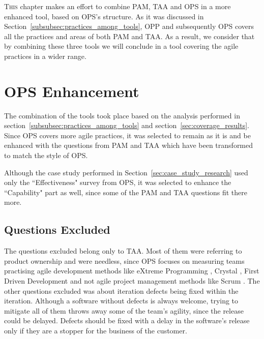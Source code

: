 \lettrine[lines=2, loversize=-0.1, lraise=0.1]{T}{his} chapter makes an effort to combine \ac{PAM}, \ac{TAA} and \ac{OPS} in a more enhanced tool, based on \ac{OPS}'s structure. As it was discussed in Section~\ref{subsubsec:practices_among_tools}, \ac{OPP} and subsequently \ac{OPS} covers all the practices and areas of both \ac{PAM} and \ac{TAA}. As a result, we consider that by combining these three tools we will conclude in a tool covering the agile practices in a wider range. 

\section{\ac{OPS} Enhancement}
The combination of the tools took place based on the analysis performed in section~\ref{subsubsec:practices_among_tools} and section~\ref{sec:coverage_results}. Since \ac{OPS} covers more agile practices, it was selected to remain as it is and be enhanced with the questions from \ac{PAM} and \ac{TAA} which have been transformed to match the style of \ac{OPS}.

Although the case study performed in Section~\ref{sec:case_study_research} used only the ``Effectiveness" survey from \ac{OPS}, it was selected to enhance the ``Capability" part as well, since some of the \ac{PAM} and \ac{TAA} questions fit there more.

\subsection{Questions Excluded}
The questions excluded belong only to \ac{TAA}. Most of them were referring to product ownership and were needless, since \ac{OPS} focuses on measuring teams practising agile development methods like eXtreme Programming \cite{Beck:2004:EPE:1076267}, Crystal \cite{Cockburn:2004:CCH:1406822}, First Driven Development \cite{Palmer:2001:PGF:600044} and not agile project management methods like Scrum \cite{scrum}. The other questions excluded was about iteration defects being fixed within the iteration. Although a software without defects is always welcome, trying to mitigate all of them throws away some of the team's agility, since the release could be delayed. Defects should be fixed with a delay in the software's release only if they are a stopper for the business of the customer.

